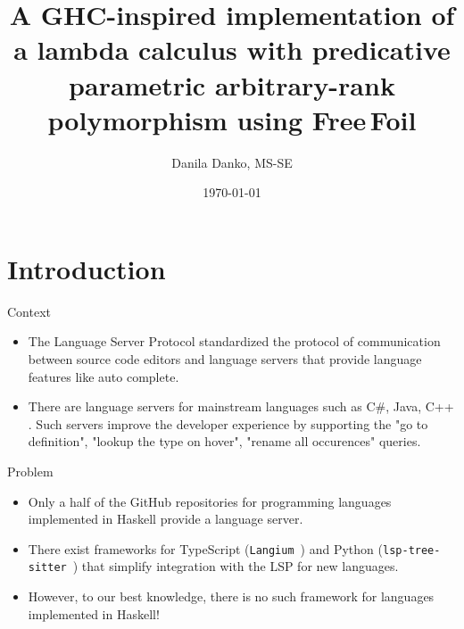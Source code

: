 \documentclass[serif, aspectratio=169]{beamer}
\author[Danko, Strygin]{Danila Danko, MS-SE \inst{1} \and \newline \newline {Supervisor: Nikolai Kudasov \inst{1}}}
\title{A GHC-inspired implementation of a lambda calculus with predicative parametric arbitrary-rank polymorphism using Free\,Foil}
\institute{
    \inst{1}Innopolis University
}
\date{\small \today}
\let\oldcite\cite
\renewcommand{\cite}[2][]{\mbox{\oldcite[#1]{#2}}}
\begin{document}
\begin{frame}
	\titlepage
\end{frame}

\begin{frame}
	\tableofcontents[sectionstyle=show,
		subsectionstyle=show/shaded/hide,
		subsubsectionstyle=show/shaded/hide]
\end{frame}

\section{Introduction}

\cite{maclaurin-foil-2022}


\begin{frame}{Context}
	\begin{itemize}
		[<+-| alert+>] %
		\item The Language Server Protocol \cite{noauthor-language-server-protocol-2024} standardized the protocol of communication between source code editors and language servers that provide language features like auto complete.
		\item There are language servers for mainstream languages such as C\#, Java, C++ \cite{lsp-implementations}. Such servers improve the developer experience by supporting the "go to definition", "lookup the type on hover", "rename all occurences" queries.
	\end{itemize}
\end{frame}

\begin{frame}{Problem}
	\begin{itemize}
		[<+-| alert+>] %
		\item Only a half of the GitHub repositories for programming languages implemented in Haskell provide a language server.
		\item There exist frameworks for TypeScript (\texttt{Langium}~\cite{noauthor-langium-nodate}) and Python (\texttt{lsp-tree-sitter}~\cite{noauthor-neomuttlsp-tree-sitter-2024}) that simplify integration with the LSP for new languages.
		\item However, to our best knowledge, there is no such framework for languages implemented in Haskell!
	\end{itemize}
\end{frame}
\end{document}
